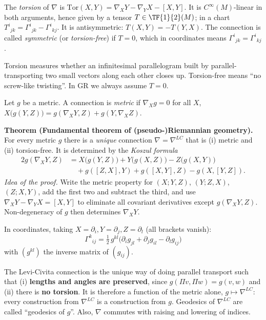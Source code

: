 \begin{formal}[{torsion}]
The \emph{torsion} of $\nabla$ is $\mathrm{Tor}(X,Y)=\nabla_XY-\nabla_YX-[X,Y]$. It is $C^\infty(M)$-linear in both arguments, hence given by a tensor $T\in\TF{1}{2}(M)$; in a chart $T^i{}_{jk}=\Gamma^i{}_{jk}-\Gamma^i{}_{kj}$. It is antisymmetric: $T(X,Y)=-T(Y,X)$. The connection is called \emph{symmetric} (or \emph{torsion-free}) if $T=0$, which in coordinates means $\Gamma^i{}_{jk}=\Gamma^i{}_{kj}$.
\end{formal}
\begin{intuition}[{torsion = twisting of the frames}]
Torsion measures whether an infinitesimal parallelogram built by parallel-transporting two small vectors along each other closes up. Torsion-free means ``no screw-like twisting''. In GR we always assume $T=0$.
\end{intuition}

\begin{formal}
Let $g$ be a metric. A connection is \emph{metric} if $\nabla_Xg=0$ for all $X$, \ie $X\big(g(Y,Z)\big)=g(\nabla_XY,Z)+g(Y,\nabla_XZ)$.

\textbf{Theorem (Fundamental theorem of (pseudo-)Riemannian geometry).} For every metric $g$ there is a \emph{unique} connection $\nabla=\nabla^{LC}$ that is (i) metric and (ii) torsion-free. It is determined by the \emph{Koszul formula}
\begin{align*}
2g(\nabla_XY,Z)&=X\big(g(Y,Z)\big)+Y\big(g(X,Z)\big)-Z\big(g(X,Y)\big)\\
&\quad+g([Z,X],Y)+g([X,Y],Z)-g(X,[Y,Z]).
\end{align*}
\emph{Idea of the proof.} Write the metric property for $(X;Y,Z)$, $(Y;Z,X)$, $(Z;X,Y)$, add the first two and subtract the third, and use $\nabla_XY-\nabla_YX=[X,Y]$ to eliminate all covariant derivatives except $g(\nabla_XY,Z)$. Non-degeneracy of $g$ then determines $\nabla_XY$.

In coordinates, taking $X=\partial_i,Y=\partial_j,Z=\partial_l$ (all brackets vanish):
\begin{equation}\label{eq:christmetric}
\boxed{\ \Gamma^k{}_{ij}=\tfrac12\,g^{kl}\big(\partial_ig_{jl}+\partial_jg_{il}-\partial_lg_{ij}\big)\ }
\end{equation}
with $(g^{kl})$ the inverse matrix of $(g_{ij})$.
\end{formal}
\begin{intuition}
The Levi-Civita connection is the unique way of doing parallel transport such that (i) \textbf{lengths and angles are preserved}, since $g(\Pi v,\Pi w)=g(v,w)$ and (ii) there is \textbf{no torsion}. It is therefore a function of the metric alone, $g\mapsto\nabla^{LC}$: every construction from $\nabla^{LC}$ is a construction from $g$. Geodesics of $\nabla^{LC}$ are called ``geodesics of $g$''. Also, $\nabla$ commutes with raising and lowering of indices.
\end{intuition}

